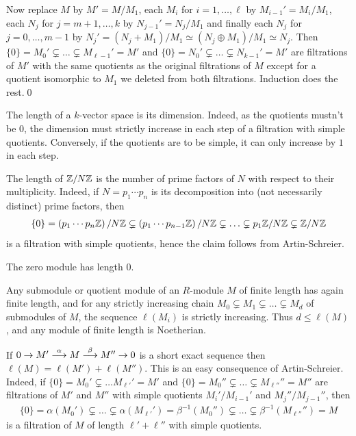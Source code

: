 \documentclass[a4paper,parskip=half,numbers=enddot, DIV=12]{scrreprt}
\begin{document}
\begin{rem}
\begin{alphanumerate}
        Now replace $M$ by $M'=M/M_1$, each $M_i$ for $i=1,\ldots,\ell$ by $M_{i-1}'=M_i/M_1$, each $N_j$ for $j= m+1,\ldots,k$ by $N_{j-1}'=N_j/M_1$ and finally each $N_j$ for $j=0,\ldots, m-1$ by $N_j'=(N_j+M_1)/M_1\simeq (N_j\oplus M_1)/M_1\simeq N_j$. Then $\{0\}=M_0'\subsetneq\ldots \subsetneq M_{\ell-1}'=M'$ and $\{0\}=N_0'\subsetneq \ldots\subsetneq N_{k-1}'=M'$ are filtrations of $M'$ with the same quotients as the original filtrations of $M$ except for a quotient isomorphic to $M_1$ we deleted from both filtrations. Induction does the rest.\qed
    \item 
        The length of a $k$-vector space is its dimension. Indeed, as the quotients mustn't be $0$, the dimension must strictly increase in each step of a filtration with simple quotients. Conversely, if the quotients are to be simple, it can only increase by $1$ in each step.
    \item
        The length of $\mathbb{Z}/N\mathbb{Z}$ is the number of prime factors of $N$ with respect to their multiplicity. Indeed, if $N=p_1\cdots p_n$ is its decomposition into (not necessarily distinct) prime factors, then
        \begin{align*}
        	\{0\}= \left(p_1\cdots p_n\mathbb{Z}\right)/N\mathbb{Z}\subsetneq \left(p_1\cdots p_{n-1}\mathbb{Z}\right)/N\mathbb{Z}\subsetneq\ldots\subsetneq p_1\mathbb{Z}/N\mathbb{Z}\subsetneq\mathbb{Z}/N\mathbb{Z}
        \end{align*}
        is a filtration with simple quotients, hence the claim follows from Artin-Schreier.
    \item 
        The zero module has length 0.
    \item 
        Any submodule or quotient module of an $R$-module $M$ of finite length has again finite length, and for any strictly increasing chain $M_0\subsetneq M_1\subsetneq\ldots\subsetneq M_d$ of submodules of $M$, the sequence $\ell(M_i)$ is strictly increasing. Thus $d\leq \ell(M)$, and any module of finite length is Noetherian.
    \item 
        If $0\morphism M' \morphism[\alpha] M\morphism[\beta] M'' \morphism 0$ is a short exact sequence then $\ell(M) = \ell(M') +\ell(M'')$. This is an easy consequence of Artin-Schreier. Indeed, if $\{0\}=M_0'\subsetneq\ldots M_{\ell'}'=M'$ and $\{0\}=M_0''\subsetneq\ldots\subsetneq M_{\ell''}''=M''$ are filtrations of $M'$ and $M''$ with simple quotients $M_i'/M_{i-1}'$ and $M_j''/M_{j-1}''$, then 
        \begin{align*}
        	\{0\}=\alpha(M_0')\subsetneq\ldots\subsetneq \alpha(M_{\ell'}')=\beta^{-1}(M_0'')\subsetneq\ldots\subsetneq \beta^{-1}(M_{\ell''}'')=M
        \end{align*}
        is a filtration of $M$ of length $\ell'+\ell''$ with simple quotients.
        

\end{alphanumerate}
\end{rem}
\end{document}
